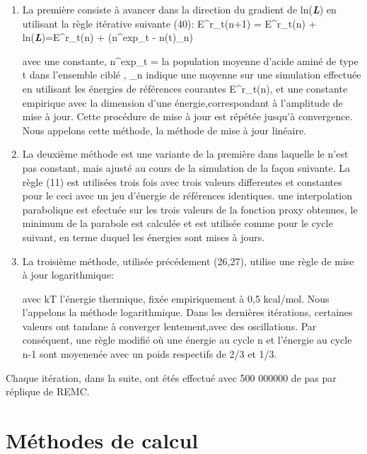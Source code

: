 \begin{enumerate}
\item La première consiste à avancer dans la direction du gradient de ln(\textit{\textbf{L}}) en utilisant la règle itérative suivante (40):
E^r_t(n+1) = E^r_t(n) + \alpha{}ln(\textit{\textbf{L}})=E^r_t(n) + \deltaE(n^{exp}_t - \langle n(t)\rangle_n)

avec \alpha une constante, n^{exp}_t =  la population moyenne d'acide aminé de type t dans l'ensemble ciblé ,
\langle\rangle_n indique une moyenne sur une simulation effectuée en utilisant les énergies de références courantes {E^r_t(n)}, et \deltaE une constante empirique avec la dimension d'une énergie,correspondant à l'amplitude de mise à jour. Cette procédure de mise à jour est répétée jusqu'à convergence. Nous appelons cette méthode, la méthode de mise à jour linéaire.

\item La deuxième méthode est une variante de la première dans laquelle le \deltaE n'est pas constant, mais ajusté au cours de la simulation de la façon suivante. La règle (11) est utilisées trois fois avec trois valeurs differentes et constantes pour le \deltaE ceci avec un jeu d'énergie de références identiques. une interpolation parabolique est efectuée sur les trois valeurs de la fonction proxy obtenues, le minimum de la parabole est calculée et est utilisée comme \deltaE pour le cycle suivant, en terme duquel les énergies sont mises à jours.

\item La troisième méthode, utilisée précédement (26,27), utilise une règle de mise à jour logarithmique:

  avec kT l'énergie thermique, fixée empiriquement à 0,5 kcal/mol. Nous l'appelons la méthode logarithmique. Dans les dernières itérations, certaines valeurs ont tandane à converger lentement,avec des oscillations. Par conséquent, une règle modifié où une énergie au cycle n et l'énergie au cycle  n-1 sont moyenenée avec un poids respectifs de 2/3 et 1/3.

\end{enumerate}
 
Chaque itération, dans la suite, ont étés effectué avec 500 000000 de pas par réplique de REMC.

\section{Méthodes de calcul}
  
